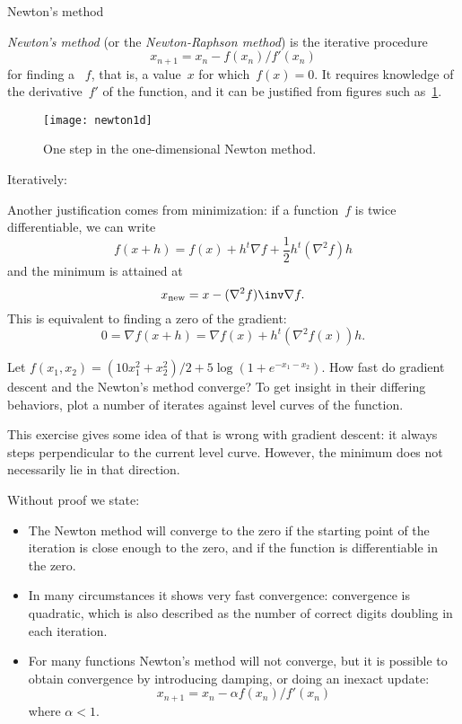  {Newton's method}
\label{sec:newton}

\emph{Newton's method}
%
(or the
\emph{Newton-Raphson method})
%
is the iterative procedure
\[ x_{n+1} = x_n-f(x_n)/f'(x_n) \]
for finding a ~$f$,
that is, a value~$x$ for which~$f(x)=0$.
It requires knowledge of the derivative~$f'$
of the function, and it can be justified from figures such
as~\ref{fig:newton1d}.

\begin{figure}[ht]
  \texttt{[image: newton1d]}
  \caption{One step in the one-dimensional Newton method.}
  \label{fig:newton1d}
\end{figure}

Iteratively:

Another justification comes from minimization: if a function~$f$ is
twice differentiable, we can write
\[ f(x+h) = f(x) + h^t\nabla f + \frac12 h^t(\nabla^2f) h \]
and the minimum is attained at
\[ x_{\scriptstyle\mathrm{new}} = x - (\nabla^2f)\inv \nabla f. \]
This is equivalent to finding a zero of the gradient:
\[ 0=\nabla f(x+h) = \nabla f(x)+h^t(\nabla^2f(x))h. \]

\begin{exercise}
  Let $f(x_1,x_2) = (10x_1^2+x_2^2)/2 + 5\log(1+e^{-x_1-x_2})$.
  How fast do gradient descent and the Newton's method converge?
  To get insight in their differing behaviors, plot a number of
  iterates against level curves of the function.
\end{exercise}

This exercise gives some idea of that is wrong with gradient descent:
it always steps perpendicular to the current level curve. However, the
minimum does not necessarily lie in that direction.

Without proof we state:
\begin{itemize}
\item The Newton method will converge to the zero if the starting
  point of the iteration is close enough to the zero, and if the
  function is differentiable in the zero.
\item In many circumstances it shows very fast convergence:
  convergence is quadratic, which is also described as the number of correct
  digits doubling in each iteration.
\item For many functions Newton's method will not converge, but it is
  possible to obtain convergence by introducing damping,
  or doing an inexact update:
  \[ x_{n+1} = x_n-\alpha f(x_n)/f'(x_n) \]
  where $\alpha<1$.
\end{itemize}

